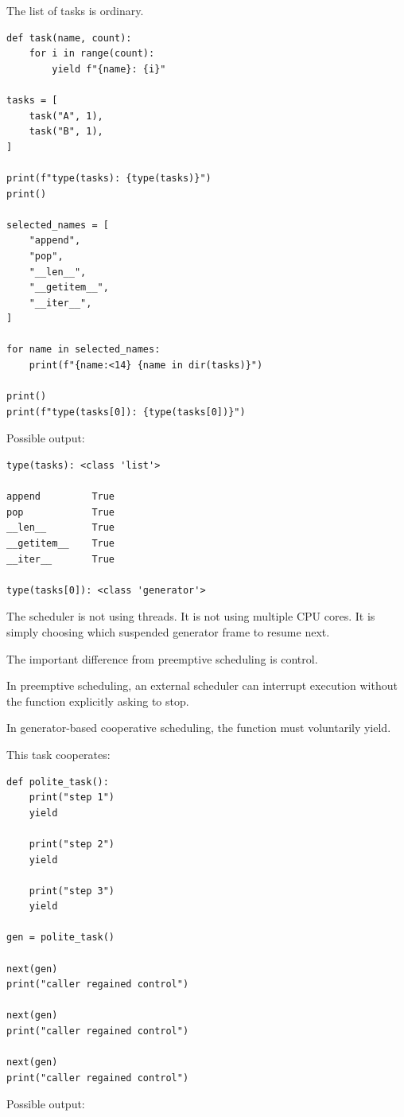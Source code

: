 The list of tasks is ordinary.

\begin{verbatim}
def task(name, count):
    for i in range(count):
        yield f"{name}: {i}"

tasks = [
    task("A", 1),
    task("B", 1),
]

print(f"type(tasks): {type(tasks)}")
print()

selected_names = [
    "append",
    "pop",
    "__len__",
    "__getitem__",
    "__iter__",
]

for name in selected_names:
    print(f"{name:<14} {name in dir(tasks)}")

print()
print(f"type(tasks[0]): {type(tasks[0])}")
\end{verbatim}

Possible output:

\begin{verbatim}
type(tasks): <class 'list'>

append         True
pop            True
__len__        True
__getitem__    True
__iter__       True

type(tasks[0]): <class 'generator'>
\end{verbatim}

The scheduler is not using threads. It is not using multiple CPU cores. It is simply choosing which suspended generator frame to resume next.

The important difference from preemptive scheduling is control.

In preemptive scheduling, an external scheduler can interrupt execution without the function explicitly asking to stop.

In generator-based cooperative scheduling, the function must voluntarily yield.

This task cooperates:

\begin{verbatim}
def polite_task():
    print("step 1")
    yield

    print("step 2")
    yield

    print("step 3")
    yield

gen = polite_task()

next(gen)
print("caller regained control")

next(gen)
print("caller regained control")

next(gen)
print("caller regained control")
\end{verbatim}

Possible output:


